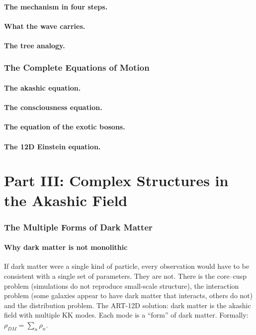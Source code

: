 \documentclass[11pt,a4paper]{article}
\begin{document}
\subsection{The mechanism in four steps.}
\subsection{What the wave carries.}
\subsection{The tree analogy.}

\section{The Complete Equations of Motion}
\subsection{The akashic equation.}
\subsection{The consciousness equation.}
\subsection{The equation of the exotic bosons.}
\subsection{The 12D Einstein equation.}

\newpage
\part*{Part III: Complex Structures in the Akashic Field}

\section{The Multiple Forms of Dark Matter}
\subsection{Why dark matter is not monolithic}
If dark matter were a single kind of particle, every observation would have to be consistent with a single set of parameters. They are not. There is the core--cusp problem (simulations do not reproduce small-scale structure), the interaction problem (some galaxies appear to have dark matter that interacts, others do not) and the distribution problem. The ART-12D solution: dark matter is the akashic field with multiple KK modes. Each mode is a ``form'' of dark matter. Formally: $\rho_{DM} = \sum_n \rho_n$.
\end{document}
